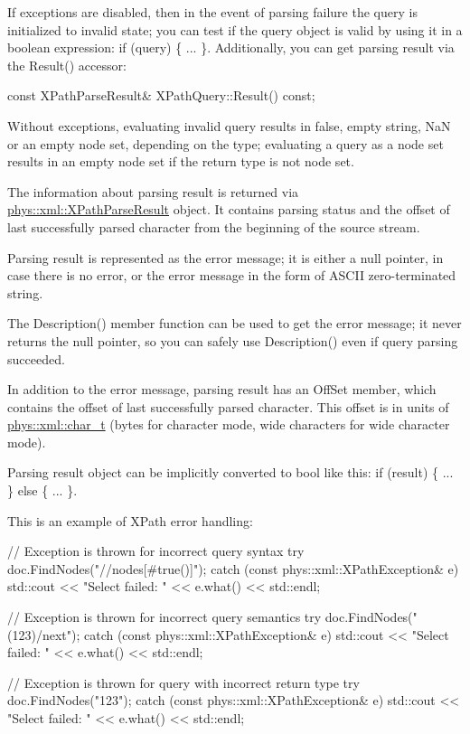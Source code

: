  If exceptions are disabled, then in the event of parsing failure the query is initialized to invalid state; you can test if the query object is valid by using it in a boolean expression: if (query) \{ ... \}. Additionally, you can get parsing result via the Result() accessor: 
\begin{DoxyCode}
 const XPathParseResult& XPathQuery::Result() const;
\end{DoxyCode}
 Without exceptions, evaluating invalid query results in false, empty string, NaN or an empty node set, depending on the type; evaluating a query as a node set results in an empty node set if the return type is not node set. \par
 \par
 The information about parsing result is returned via \hyperlink{structphys_1_1xml_1_1XPathParseResult}{phys::xml::XPathParseResult} object. It contains parsing status and the offset of last successfully parsed character from the beginning of the source stream. \par
 \par
 Parsing result is represented as the error message; it is either a null pointer, in case there is no error, or the error message in the form of ASCII zero-\/terminated string. \par
 \par
 The Description() member function can be used to get the error message; it never returns the null pointer, so you can safely use Description() even if query parsing succeeded. \par
 \par
 In addition to the error message, parsing result has an OffSet member, which contains the offset of last successfully parsed character. This offset is in units of \hyperlink{namespacephys_1_1xml_afc87705cd1c2917d87b879715a2d8f6e}{phys::xml::char\_\-t} (bytes for character mode, wide characters for wide character mode). \par
 \par
 Parsing result object can be implicitly converted to bool like this: if (result) \{ ... \} else \{ ... \}. \par
 \par
 This is an example of XPath error handling: 
\begin{DoxyCode}
 // Exception is thrown for incorrect query syntax
 try
 {
     doc.FindNodes("//nodes[#true()]");
 }
 catch (const phys::xml::XPathException& e)
 {
     std::cout << "Select failed: " << e.what() << std::endl;
 }

 // Exception is thrown for incorrect query semantics
 try
 {
 doc.FindNodes("(123)/next");
 }
 catch (const phys::xml::XPathException& e)
 {
     std::cout << "Select failed: " << e.what() << std::endl;
 }

 // Exception is thrown for query with incorrect return type
 try
 {
     doc.FindNodes("123");
 }
 catch (const phys::xml::XPathException& e)
 {
     std::cout << "Select failed: " << e.what() << std::endl;
 }
\end{DoxyCode}
